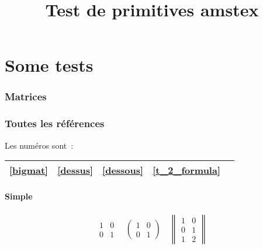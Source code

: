 \documentclass{article}
\title{Test de primitives amstex}
\date{}
\numberwithin{equation}{section}
\begin{document}
\maketitle

\part{Some tests}
\section{Matrices}
\section*{Toutes les r\'ef\'erences}
Les num\'eros sont~:

\begin{tabular}{*{5}{|c}|}\hline
\ref{bigmat} & \ref{dessus} & \ref{dessous} & \ref{t_2_formula}\\ \hline
\end{tabular}

\subsection{Simple}
\begin{gather}
\begin{matrix} 1 & 0\\ 0 & 1\end{matrix}
\quad
\begin{pmatrix} 1 & 0\\ 0 & 1\end{pmatrix}
\quad
\begin{Vmatrix} 1 & 0\\ 0 & 1\\ 1 & 2\end{Vmatrix}
\end{gather}
\end{document}
